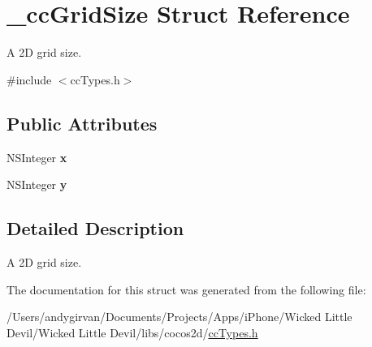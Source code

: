 \hypertarget{struct__cc_grid_size}{\section{\-\_\-cc\-Grid\-Size Struct Reference}
\label{struct__cc_grid_size}
}


A 2\-D grid size.  




{\ttfamily \#include $<$cc\-Types.\-h$>$}

\subsection*{Public Attributes}
\begin{DoxyCompactItemize}
\item 
\hypertarget{struct__cc_grid_size_a8f99586c7c09c841be4a558505d260f6}{N\-S\-Integer {\bfseries x}}\label{struct__cc_grid_size_a8f99586c7c09c841be4a558505d260f6}

\item 
\hypertarget{struct__cc_grid_size_a71f35e7ceb93c234e24c34b647447f62}{N\-S\-Integer {\bfseries y}}\label{struct__cc_grid_size_a71f35e7ceb93c234e24c34b647447f62}

\end{DoxyCompactItemize}


\subsection{Detailed Description}
A 2\-D grid size. 

The documentation for this struct was generated from the following file\-:\begin{DoxyCompactItemize}
\item 
/\-Users/andygirvan/\-Documents/\-Projects/\-Apps/i\-Phone/\-Wicked Little Devil/\-Wicked Little Devil/libs/cocos2d/\hyperlink{cc_types_8h}{cc\-Types.\-h}\end{DoxyCompactItemize}
